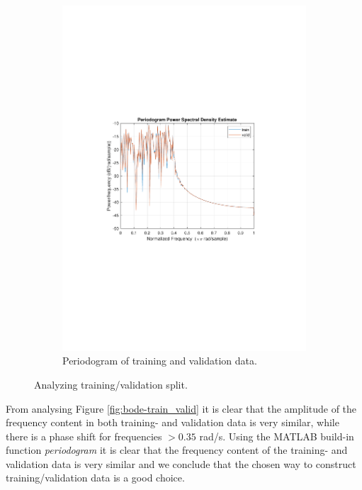 \documentclass[]{article}
\begin{document}
\begin{figure}[ht]
\begin{subfigure}{.49\textwidth}
	\includegraphics[trim= 10cm 8cm 10cm 8cm, scale=0.4]{figures/periodogram-train_valid.pdf}
	\caption{Periodogram of training and validation data.}
	\label{fig:periodogram-train_valid}
\end{subfigure}
\caption{Analyzing training/validation split.}
\label{fig:train_valid}
\end{figure}

From analysing Figure \ref{fig:bode-train_valid} it is clear that the amplitude of the frequency content in both training- and validation data is very similar, while there is a phase shift for frequencies $>0.35$ rad/s. Using the MATLAB build-in function \emph{periodogram} it is clear that the frequency content of the training- and validation data is very similar and we conclude that the chosen way to construct training/validation data is a good choice.
\end{document}
